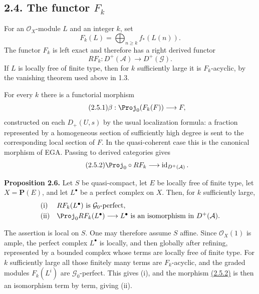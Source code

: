 \subsection*{2.4. The functor \(F_k\)}
For an \(\mathcal O_X\)-module \(L\) and an integer \(k\), set
\begin{equation}\tag{2.4.1}
  F_k(L)=\bigoplus_{n\geq k} f_*(L(n)).
\end{equation}
The functor \(F_k\) is left exact and therefore has a right derived functor
\begin{equation}\tag{2.4.2}
  RF_k:D^+(\mathcal A)\longrightarrow D^+(\mathcal G).
\end{equation}
If \(L\) is locally free of finite type, then for \(k\) sufficiently large it is \(F_k\)-acyclic, by the vanishing theorem used above in 1.3.

For every \(k\) there is a functorial morphism
\begin{equation}\tag{2.5.1}
  \beta:\Proj_0(F_k(F))\longrightarrow F,
\end{equation}
constructed on each \(D_+(U,s)\) by the usual localization formula: a fraction represented by a homogeneous section of sufficiently high degree is sent to the corresponding local section of \(F\). In the quasi-coherent case this is the canonical morphism of EGA. Passing to derived categories gives
\begin{equation}\tag{2.5.2}
  \Proj_0\circ RF_k \longrightarrow \operatorname{id}_{D^+(\mathcal A)}.
\end{equation}

\textbf{Proposition 2.6.} Let \(S\) be quasi-compact, let \(E\) be locally free of finite type, let \(X=\mathbf P(E)\), and let \(L^\bullet\) be a perfect complex on \(X\). Then, for \(k\) sufficiently large,
\[
\begin{array}{ll}
\text{\rm (i)}& RF_k(L^\bullet)\text{ is }\mathcal G_0\text{-perfect},\\[1mm]
\text{\rm (ii)}& \Proj_0 RF_k(L^\bullet)\longrightarrow L^\bullet
\text{ is an isomorphism in }D^+(\mathcal A).
\end{array}
\]

The assertion is local on \(S\). One may therefore assume \(S\) affine. Since \(\mathcal O_X(1)\) is ample, the perfect complex \(L^\bullet\) is locally, and then globally after refining, represented by a bounded complex whose terms are locally free of finite type. For \(k\) sufficiently large all those finitely many terms are \(F_k\)-acyclic, and the graded modules \(F_k(L^i)\) are \(\mathcal G_0\)-perfect. This gives (i), and the morphism \hyperlink{sga6.e06.eq.2-5-2}{(2.5.2)} is then an isomorphism term by term, giving (ii).

